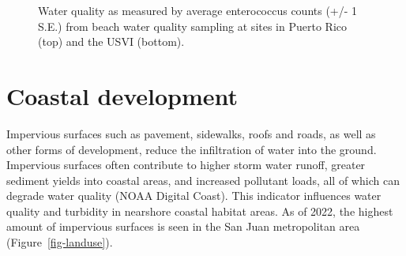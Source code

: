 \documentclass[
  letterpaper,
  oneside,
  open=any]{scrbook}
\begin{document}
\begin{figure}


\caption{\label{fig-ent}Water quality as measured by average
enterococcus counts (+/- 1 S.E.) from beach water quality sampling at
sites in Puerto Rico (top) and the USVI (bottom).}

\end{figure}%

\section{Coastal development}\label{coastal-development}

Impervious surfaces such as pavement, sidewalks, roofs and roads, as
well as other forms of development, reduce the infiltration of water
into the ground. Impervious surfaces often contribute to higher storm
water runoff, greater sediment yields into coastal areas, and increased
pollutant loads, all of which can degrade water quality (NOAA Digital
Coast). This indicator influences water quality and turbidity in
nearshore coastal habitat areas. As of 2022, the highest amount of
impervious surfaces is seen in the San Juan metropolitan area
(Figure~\ref{fig-landuse}).
\end{document}
